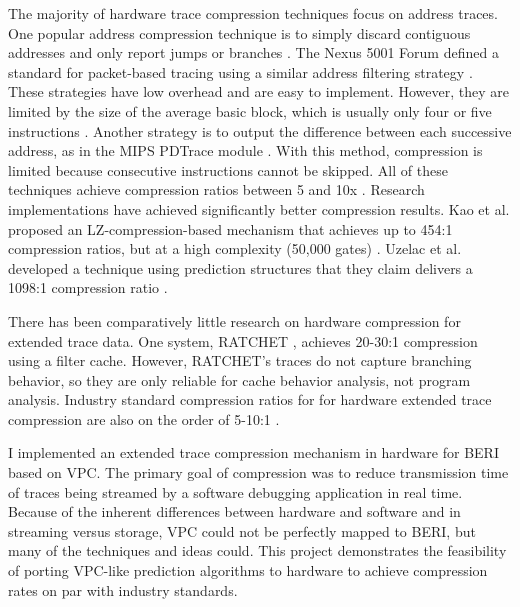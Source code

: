 \documentclass[conference]{IEEEtran}
\begin{document}
The majority of hardware trace compression techniques focus on address traces. One popular address compression technique is to simply discard contiguous addresses and only report jumps or branches \cite{armspec} \cite{tc1775} \cite{nios2003}. The Nexus 5001 Forum defined a standard for packet-based tracing using a similar address filtering strategy \cite{nexus5001}. These strategies have low overhead and are easy to implement. However, they are limited by the size of the average basic block, which is usually only four or five instructions \cite{rotenberg1999}. Another strategy is to output the difference between each successive address, as in the MIPS PDTrace module \cite{mipspd}. With this method, compression is limited because consecutive instructions cannot be skipped. All of these techniques achieve compression ratios between 5 and 10x \cite{macnamee2000}. Research implementations have achieved significantly better compression results. Kao et al. proposed an LZ-compression-based mechanism that achieves up to 454:1 compression ratios, but at a high complexity (50,000 gates) \cite{kao2007}. Uzelac et al. developed a technique using prediction structures that they claim delivers a 1098:1 compression ratio \cite{uzelac2014}. 

There has been comparatively little research on hardware compression for extended trace data. One system, RATCHET \cite{thatssoratchet}, achieves 20-30:1 compression using a filter cache. However, RATCHET's traces do not capture branching behavior, so they are only reliable for cache behavior analysis, not program analysis. Industry standard compression ratios for for hardware extended trace compression are also on the order of 5-10:1 \cite{hopkins2006}.  

I implemented an extended trace compression mechanism in hardware for BERI based on VPC. The primary goal of compression was to reduce transmission time of traces being streamed by a software debugging application in real time. Because of the inherent differences between hardware and software and in streaming versus storage, VPC could not be perfectly mapped to BERI, but many of the techniques and ideas could. This project demonstrates the feasibility of porting VPC-like prediction algorithms to hardware to achieve compression rates on par with industry standards. 
\end{document}
